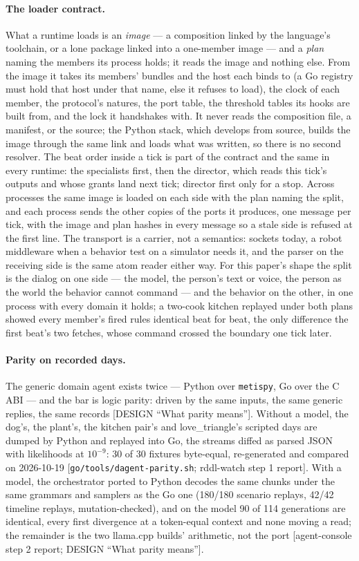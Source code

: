 \documentclass[11pt]{article}
\newcommand{\metispy}{\texttt{metispy}}
\newcommand{\src}[1]{{\footnotesize\textsf{[#1]}}}
\begin{document}
\paragraph{The loader contract.} What a runtime loads is an \emph{image}
--- a composition linked by the language's toolchain, or a lone package
linked into a one-member image --- and a \emph{plan} naming the members
its process holds; it reads the image and nothing else. From the image
it takes its members' bundles and the host each binds to (a Go registry
must hold that host under that name, else it refuses to load), the
clock of each member, the protocol's natures, the port table, the
threshold tables its hooks are built from, and the lock it handshakes
with. It never reads the composition file, a manifest, or the source;
the Python stack, which develops from source, builds the image through
the same link and loads what was written, so there is no second
resolver. The beat order inside a tick is part of the contract and the
same in every runtime: the specialists first, then the director, which
reads this tick's outputs and whose grants land next tick; director
first only for a stop. Across processes the same image is loaded on
each side with the plan naming the split, and each process sends the
other copies of the ports it produces, one message per tick, with the
image and plan hashes in every message so a stale side is refused at
the first line. The transport is a carrier, not a semantics: sockets
today, a robot middleware when a behavior test on a simulator needs it,
and the parser on the receiving side is the same atom reader either
way. For this paper's shape the split is the dialog on one side ---
the model, the person's text or voice, the person as the world the
behavior cannot command --- and the behavior on the other, in one
process with every domain it holds; a two-cook kitchen replayed under
both plans showed every member's fired rules identical beat for beat,
the only difference the first beat's two fetches, whose command crossed
the boundary one tick later.

\paragraph{Parity on recorded days.} The generic domain agent exists twice --- Python over
\metispy{}, Go over the C ABI --- and the bar is logic parity: driven by the same inputs,
the same generic replies, the same records \src{DESIGN ``What parity means''}. Without a
model, the dog's, the plant's, the kitchen pair's and love\_triangle's scripted days are
dumped by Python and replayed into Go, the streams diffed as parsed JSON with likelihoods at
$10^{-9}$: 30 of 30 fixtures byte-equal, re-generated and compared on 2026-10-19
\src{\texttt{go/tools/dagent-parity.sh}; rddl-watch step 1 report}. With a model, the
orchestrator ported to Python decodes the same chunks under the same grammars and samplers as
the Go one (180/180 scenario replays, 42/42 timeline replays, mutation-checked), and on the
model 90 of 114 generations are identical, every first divergence at a token-equal context
and none moving a read; the remainder is the two llama.cpp builds' arithmetic, not the port
\src{agent-console step 2 report; DESIGN ``What parity means''}.
\end{document}
